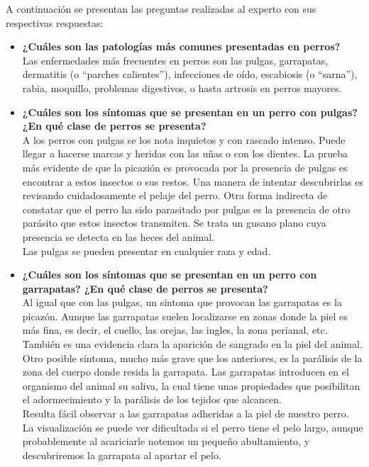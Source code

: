 \documentclass[a4paper,table,xcdraw]{article}
\begin{document}
A continuación se presentan las preguntas realizadas al experto con sus respectivas respuestas:
\begin{itemize}
    \item \textbf{¿Cuáles son las patologías más comunes presentadas en perros?}\\
    Las enfermedades más frecuentes en perros son las pulgas, garrapatas, dermatitis (o ``parches calientes''), infecciones de oído, escabiosis (o ``sarna''), rabia, moquillo, problemas digestivos, o hasta artrosis en perros mayores.
    \item \textbf{¿Cuáles son los síntomas que se
    presentan en un perro con pulgas? ¿En qué clase de perros se presenta?}\\
    A los perros con pulgas se los nota inquietos y con rascado intenso. Puede llegar a hacerse marcas y heridas con las uñas o con los dientes. La prueba más evidente de que la picazión es provocada por la presencia de pulgas es encontrar a estos insectos o sus restos. Una manera de intentar descubrirlas es revisando cuidadosamente el pelaje del perro.
    Otra forma indirecta de constatar que el perro ha sido parasitado por pulgas es la presencia de otro parásito que estos insectos transmiten. Se trata un gusano plano cuya presencia se detecta en las heces del animal.\\
    Las pulgas se pueden presentar en cualquier raza y edad.
    \item \textbf{¿Cuáles son los síntomas que se presentan en un perro con garrapatas? ¿En qué clase de perros se presenta?}\\
    Al igual que con las pulgas, un síntoma que provocan las garrapatas es la picazón. Aunque las garrapatas suelen localizarse en zonas donde la piel es más fina, es decir, el cuello, las orejas, las ingles, la zona perianal, etc. 
    También es una evidencia clara la aparición de sangrado en la piel del animal.
    Otro posible síntoma, mucho más grave que los anteriores, es la parálisis de la zona del cuerpo donde resida la garrapata. Las garrapatas introducen en el organismo del animal su saliva, la cual tiene unas propiedades que posibilitan el adormecimiento y la parálisis de los tejidos que alcancen.\\
    Resulta fácil observar a las garrapatas adheridas a la piel de nuestro perro. La visualización se puede ver dificultada si el perro tiene el pelo largo, aunque probablemente al acariciarle notemos un pequeño abultamiento, y descubriremos la garrapata al apartar el pelo.\\

\end{itemize}
\end{document}

